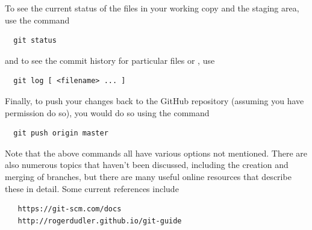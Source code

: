 To see the current status of the files in your working copy
and the staging area, use the command
\begin{verbatim}
  git status
\end{verbatim}
and to see the commit history for particular files or \directories{},
use 
\begin{verbatim}
  git log [ <filename> ... ]
\end{verbatim}

Finally, to push your changes back to the GitHub repository (assuming
you have permission do so), you would do so using the command
\begin{verbatim}
  git push origin master
\end{verbatim}

Note that the above commands all have various options not mentioned.
There are also numerous topics that haven't been discussed, including
the creation and merging of branches, but there are many useful online
resources that describe these in detail. Some current references
include
\begin{verbatim}
   https://git-scm.com/docs
   http://rogerdudler.github.io/git-guide
\end{verbatim}




